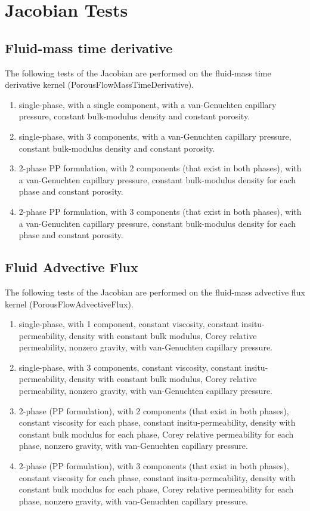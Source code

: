\chapter{Jacobian Tests}

\section{Fluid-mass time derivative}

The following tests of the Jacobian are performed on the fluid-mass time derivative kernel (PorousFlowMassTimeDerivative).
\begin{enumerate}
\item single-phase, with a single component, with a van-Genuchten capillary pressure, constant bulk-modulus density and constant porosity.
\item single-phase, with 3 components, with a van-Genuchten capillary pressure, constant bulk-modulus density and constant porosity.
\item 2-phase PP formulation, with 2 components (that exist in both phases), with a van-Genuchten capillary pressure, constant bulk-modulus density for each phase and constant porosity.
\item 2-phase PP formulation, with 3 components (that exist in both phases), with a van-Genuchten capillary pressure, constant bulk-modulus density for each phase and constant porosity.
\end{enumerate}


\section{Fluid Advective Flux}

The following tests of the Jacobian are performed on the fluid-mass advective flux kernel (PorousFlowAdvectiveFlux).
\begin{enumerate}
\item single-phase, with 1 component, constant viscosity, constant insitu-permeability, density with constant bulk modulus, Corey relative permeability, nonzero gravity, with van-Genuchten capillary pressure.
\item single-phase, with 3 components, constant viscosity, constant insitu-permeability, density with constant bulk modulus, Corey relative permeability, nonzero gravity, with van-Genuchten capillary pressure.
\item 2-phase (PP formulation), with 2 components (that exist in both phases), constant viscosity for each phase, constant insitu-permeability, density with constant bulk modulus for each phase, Corey relative permeability for each phase, nonzero gravity, with van-Genuchten capillary pressure.
\item 2-phase (PP formulation), with 3 components (that exist in both phases), constant viscosity for each phase, constant insitu-permeability, density with constant bulk modulus for each phase, Corey relative permeability for each phase, nonzero gravity, with van-Genuchten capillary pressure.
\end{enumerate}
